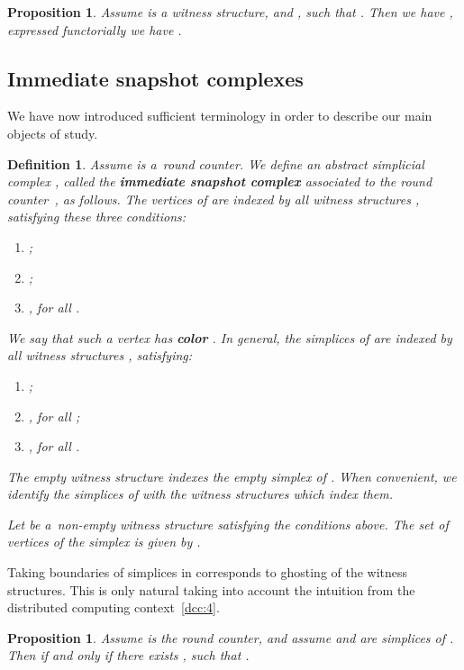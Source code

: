 \documentclass{amsart}[10pt]
\newtheorem{df}[theorem]{Definition}
\newtheorem{prop}[theorem]{Proposition}
\numberwithin{equation}{section}
\numberwithin{figure}{section}
\numberwithin{table}{section}
\begin{document}
\begin{prop} 
\label{prop:gg}
Assume  is a witness structure, and , 
such that . Then we have
, expressed 
functorially we have .
\end{prop}

\subsection{Immediate snapshot complexes} 

\nin We have now introduced sufficient terminology in order to
describe our main objects of study.

\begin{df}\label{df:ptr}
Assume  is a~round counter. We define an abstract simplicial
complex , called the {\bf immediate snapshot complex}
associated to the round counter~, as follows. The vertices of
 are indexed by all witness structures , satisfying these three
conditions:
\begin{enumerate}
\item ;
\item ;
\item , for all .
\end{enumerate}
\nin We say that such a vertex has {\bf color} . In general, the
simplices of  are indexed by all witness structures
, satisfying:
\begin{enumerate}
\item ;
\item , for all ;
\item , for all .
\end{enumerate}

\nin The empty witness structure  indexes the empty
simplex of . When convenient, we identify the simplices of
 with the witness structures which index them.  

Let  be a~non-empty witness structure satisfying the
conditions above. The set of vertices  of the simplex 
is given by .
\end{df}

Taking boundaries of simplices in  corresponds to ghosting of
the witness structures. This is only natural taking into account the
intuition from the distributed computing context~\ref{dcc:4}.

\begin{prop}
\label{prop:b}
Assume  is the round counter, and assume  and  are
simplices of . Then  if and only if there
exists , such that .
\end{prop}
\end{document}
